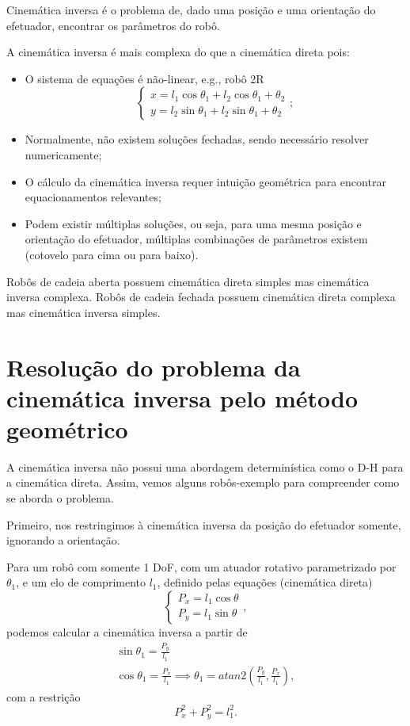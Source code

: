 
Cinemática inversa é o problema de, dado uma posição e uma orientação do efetuador, encontrar os parâmetros do robô.

A cinemática inversa é mais complexa do que a cinemática direta pois:
\begin{itemize}
    \item O sistema de equações é não-linear, e.g., robô 2R \[
    \begin{cases}
        x = l_1 \cos \theta_1 + l_2 \cos \theta_1 + \theta_2 \\
	y = l_2 \sin\theta_1 + l_2 \sin\theta_1+\theta_2
    \end{cases}
    ;\] 
    \item Normalmente, não existem soluções fechadas, sendo necessário resolver numericamente;
    \item O cálculo da cinemática inversa requer intuição geométrica para encontrar equacionamentos relevantes;
    \item Podem existir múltiplas soluções, ou seja, para uma mesma posição e orientação do efetuador, múltiplas combinações de parâmetros existem (cotovelo para cima ou para baixo).
\end{itemize}

\begin{note}
    Robôs de cadeia aberta possuem cinemática direta simples mas cinemática inversa complexa. Robôs de cadeia fechada possuem cinemática direta complexa mas cinemática inversa simples.
\end{note}

\section*{Resolução do problema da cinemática inversa pelo método geométrico}

A cinemática inversa não possui uma abordagem determinística como o D-H para a cinemática direta. Assim, vemos alguns robôs-exemplo para compreender como se aborda o problema.

Primeiro, nos restringimos à cinemática inversa da posição do efetuador somente, ignorando a orientação.

Para um robô com somente 1 DoF, com um atuador rotativo parametrizado por $\theta_1$, e um elo de comprimento $l_1$, definido pelas equações (cinemática direta) \[
\begin{cases}
    P_x = l_1\cos\theta \\
    P_y = l_1 \sin\theta
\end{cases}
,\] podemos calcular a cinemática inversa a partir de
\begin{align*}
    \sin \theta_1 = \frac{P_y}{l_1} \\
    \cos\theta_1 = \frac{P_x}{l_1}
    \implies \theta_1 = atan2\left( \frac{P_y}{l_1}, \frac{P_x}{l_1} \right) 
,\end{align*}
com a restrição \[
P_x^2 + P_y^2 = l_1^2
.\] 

